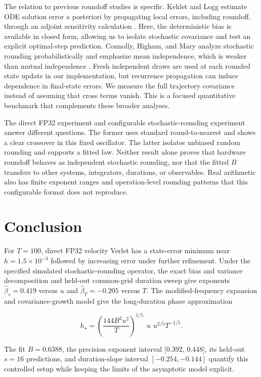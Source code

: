 \documentclass[
11pt
]{article}
\begin{document}
The relation to previous roundoff studies is specific. Kehlet and Logg
estimate ODE solution error a posteriori by propagating local errors,
including roundoff, through an adjoint sensitivity calculation \cite{kehlet2017}.
Here, the deterministic bias is available in closed form, allowing us to
isolate stochastic covariance and test an explicit optimal-step
prediction. Connolly, Higham, and Mary analyze stochastic rounding
probabilistically and emphasize mean independence, which is weaker than
mutual independence \cite{connolly2021}. Fresh independent draws are used at each rounded
state update in our implementation, but recurrence propagation can
induce dependence in final-state errors. We measure the full trajectory
covariance instead of assuming that cross terms vanish. This is a
focused quantitative benchmark that complements these broader analyses.

The direct FP32 experiment and configurable stochastic-rounding
experiment answer different questions. The former uses standard
round-to-nearest and shows a clear crossover in this fixed oscillator.
The latter isolates unbiased random rounding and supports a fitted law.
Neither result alone proves that hardware roundoff behaves as
independent stochastic rounding, nor that the fitted \(B\) transfers to
other systems, integrators, durations, or observables. Real arithmetic
also has finite exponent ranges and operation-level rounding patterns
that this configurable format does not reproduce.

\section{Conclusion}\label{conclusion}

For \(T=100\), direct FP32 velocity Verlet has a state-error minimum
near \(h=1.5\times10^{-3}\) followed by increasing error under further
refinement. Under the specified simulated stochastic-rounding operator,
the exact
bias and variance decomposition and held-out common-grid duration sweep
give exponents \(\hat\beta_s=0.419\) versus \(u\) and
\(\hat\beta_T=-0.205\) versus \(T\). The modified-frequency expansion
and covariance-growth model give the long-duration phase approximation

\[
h_{\star}=\left(\frac{144B^2u^2}{T}\right)^{1/5}\propto u^{2/5}T^{-1/5}.
\]

The fit \(B=0.6388\), the precision exponent interval [0.392, 0.448],
its held-out \(s=16\) predictions, and duration-slope interval
\([-0.254,-0.144]\) quantify this controlled setup while keeping the
limits of the asymptotic model explicit.
\end{document}
